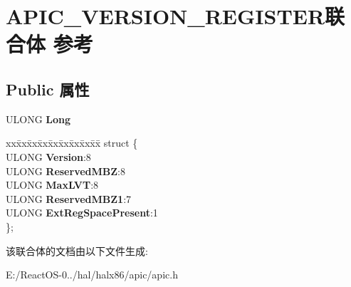\hypertarget{union_a_p_i_c___v_e_r_s_i_o_n___r_e_g_i_s_t_e_r}{}\section{A\+P\+I\+C\+\_\+\+V\+E\+R\+S\+I\+O\+N\+\_\+\+R\+E\+G\+I\+S\+T\+E\+R联合体 参考}
\label{union_a_p_i_c___v_e_r_s_i_o_n___r_e_g_i_s_t_e_r}
\subsection*{Public 属性}
\begin{DoxyCompactItemize}
\item 
\mbox{\label{union_a_p_i_c___v_e_r_s_i_o_n___r_e_g_i_s_t_e_r_aa0bb22bd496e806efd5d44ede5a280d8}} 
U\+L\+O\+NG {\bfseries Long}
\item 
\mbox{\label{union_a_p_i_c___v_e_r_s_i_o_n___r_e_g_i_s_t_e_r_a2d93f296f927e0bc805ecc4ba38dadfc}} 
\begin{tabbing}
xx\=xx\=xx\=xx\=xx\=xx\=xx\=xx\=xx\=\kill
struct \{\\
\>ULONG {\bfseries Version}:8\\
\>ULONG {\bfseries ReservedMBZ}:8\\
\>ULONG {\bfseries MaxLVT}:8\\
\>ULONG {\bfseries ReservedMBZ1}:7\\
\>ULONG {\bfseries ExtRegSpacePresent}:1\\
\}; \\

\end{tabbing}\end{DoxyCompactItemize}


该联合体的文档由以下文件生成\+:\begin{DoxyCompactItemize}
\item 
E\+:/\+React\+O\+S-\/0../hal/halx86/apic/apic.\+h\end{DoxyCompactItemize}
